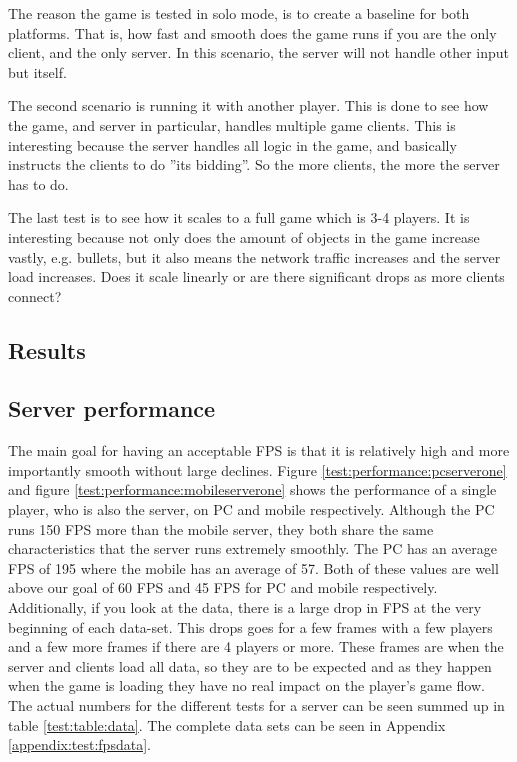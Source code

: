 The reason the game is tested in solo mode, is to create a baseline for both platforms. 
That is, how fast and smooth does the game runs if you are the only client, and the only server. 
In this scenario, the server will not handle other input but itself.

The second scenario is running it with another player. This is done to see how the game, and server in particular, handles multiple game clients. 
This is interesting because the server handles all logic in the game, and basically instructs the clients to do ''its bidding''. 
So the more clients, the more the server has to do. 

The last test is to see how it scales to a full game which is 3-4 players. 
It is interesting because not only does the amount of objects in the game increase vastly, e.g. bullets, but it also means the network traffic increases and the server load increases. 
Does it scale linearly or are there significant drops as more clients connect?

\subsection{Results}
\subsection*{Server performance}
The main goal for having an acceptable FPS is that it is relatively high and more importantly smooth without large declines. 
Figure \ref{test:performance:pcserverone} and figure \ref{test:performance:mobileserverone} shows the performance of a single player, who is also the server, on PC and mobile respectively. 
Although the PC runs 150 FPS more than the mobile server, they both share the same characteristics that the server runs extremely smoothly. 
The PC has an average FPS of 195 where the mobile has an average of 57. Both of these values are well above our goal of 60 FPS and 45 FPS for PC and mobile respectively. 
Additionally, if you look at the data, there is a large drop in FPS at the very beginning of each data-set. 
This drops goes for a few frames with a few players and a few more frames if there are 4 players or more. 
These frames are when the server and clients load all data, so they are to be expected and as they happen when the game is loading they have no real impact on the player's game flow. 
The actual numbers for the different tests for a server can be seen summed up in table \ref{test:table:data}. 
The complete data sets can be seen in Appendix \ref{appendix:test:fpsdata}.


